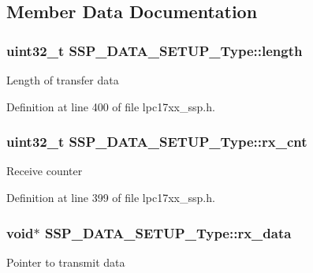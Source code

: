 \subsection{\-Member \-Data \-Documentation}
\hypertarget{struct_s_s_p___d_a_t_a___s_e_t_u_p___type_a15861aad38292a3b5b5bc2137be7b471}{
\subsubsection[{length}]{\setlength{\rightskip}{0pt plus 5cm}uint32\-\_\-t {\bf \-S\-S\-P\-\_\-\-D\-A\-T\-A\-\_\-\-S\-E\-T\-U\-P\-\_\-\-Type\-::length}}}\label{struct_s_s_p___d_a_t_a___s_e_t_u_p___type_a15861aad38292a3b5b5bc2137be7b471}
\-Length of transfer data 

\-Definition at line 400 of file lpc17xx\-\_\-ssp.\-h.

\hypertarget{struct_s_s_p___d_a_t_a___s_e_t_u_p___type_ad0a0475e1e9ebfd10d6ddacf40a34e20}{
\subsubsection[{rx\-\_\-cnt}]{\setlength{\rightskip}{0pt plus 5cm}uint32\-\_\-t {\bf \-S\-S\-P\-\_\-\-D\-A\-T\-A\-\_\-\-S\-E\-T\-U\-P\-\_\-\-Type\-::rx\-\_\-cnt}}}\label{struct_s_s_p___d_a_t_a___s_e_t_u_p___type_ad0a0475e1e9ebfd10d6ddacf40a34e20}
\-Receive counter 

\-Definition at line 399 of file lpc17xx\-\_\-ssp.\-h.

\hypertarget{struct_s_s_p___d_a_t_a___s_e_t_u_p___type_a8ecbeda1d5013eb75f16e9260e1e99df}{
\subsubsection[{rx\-\_\-data}]{\setlength{\rightskip}{0pt plus 5cm}void$\ast$ {\bf \-S\-S\-P\-\_\-\-D\-A\-T\-A\-\_\-\-S\-E\-T\-U\-P\-\_\-\-Type\-::rx\-\_\-data}}}\label{struct_s_s_p___d_a_t_a___s_e_t_u_p___type_a8ecbeda1d5013eb75f16e9260e1e99df}
\-Pointer to transmit data 

